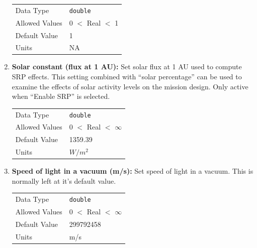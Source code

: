 \begin{enumerate}
            \begin{table}[H]
                \hspace{2cm}
                \begin{tabular}{ll}
                Data Type & \verb|double| \\
                Allowed Values & 0 $<$ Real $<$ 1 \\
                Default Value & 1 \\
                Units & NA
                \end{tabular}
            \end{table}

        \item \textbf{Solar constant (flux at 1 AU):} Set solar flux at 1 AU used to compute \ac{SRP} effects. This setting combined with ``solar percentage'' can be used to examine the effects of solar activity levels on the mission design. Only active when ``Enable \ac{SRP}'' is selected.
        
            \begin{table}[H]
                \hspace{2cm}
                \begin{tabular}{ll}
                Data Type & \verb|double| \\
                Allowed Values & 0 $<$ Real $<$ $\infty$ \\
                Default Value & 1359.39 \\
                Units & $W/m^2$
                \end{tabular}
            \end{table}

        \item \textbf{Speed of light in a vacuum (m/s):} Set speed of light in a vacuum. This is normally left at it's default value.

        \begin{table}[H]
            \hspace{2cm}
            \begin{tabular}{ll}
            Data Type & \verb|double| \\
            Allowed Values & 0 $<$ Real $<$ $\infty$ \\
            Default Value & 299792458 \\
            Units & m/s
            \end{tabular}
        \end{table}

    \end{enumerate}